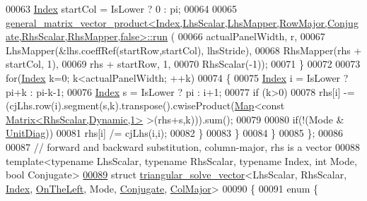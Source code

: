 \begin{DoxyCode}
00063         \hyperlink{namespace_eigen_a62e77e0933482dafde8fe197d9a2cfde}{Index} startCol = IsLower ? 0 : pi;
00064 
00065         
      \hyperlink{struct_eigen_1_1internal_1_1general__matrix__vector__product}{general\_matrix\_vector\_product<Index,LhsScalar,LhsMapper,RowMajor,Conjugate,RhsScalar,RhsMapper,false>::run}
      (
00066           actualPanelWidth, r,
00067           LhsMapper(&lhs.coeffRef(startRow,startCol), lhsStride),
00068           RhsMapper(rhs + startCol, 1),
00069           rhs + startRow, 1,
00070           RhsScalar(-1));
00071       \}
00072 
00073       \textcolor{keywordflow}{for}(\hyperlink{namespace_eigen_a62e77e0933482dafde8fe197d9a2cfde}{Index} k=0; k<actualPanelWidth; ++k)
00074       \{
00075         \hyperlink{namespace_eigen_a62e77e0933482dafde8fe197d9a2cfde}{Index} i = IsLower ? pi+k : pi-k-1;
00076         \hyperlink{namespace_eigen_a62e77e0933482dafde8fe197d9a2cfde}{Index} s = IsLower ? pi   : i+1;
00077         \textcolor{keywordflow}{if} (k>0)
00078           rhs[i] -= (cjLhs.row(i).segment(s,k).transpose().cwiseProduct(\hyperlink{group___core___module_class_eigen_1_1_map}{Map}<\textcolor{keyword}{const} 
      \hyperlink{group___core___module_class_eigen_1_1_matrix}{Matrix<RhsScalar,Dynamic,1>} >(rhs+s,k))).sum();
00079 
00080         \textcolor{keywordflow}{if}(!(Mode & \hyperlink{group__enums_gga39e3366ff5554d731e7dc8bb642f83cdaddb72f888ac85d5a1c52333e54f9374b}{UnitDiag}))
00081           rhs[i] /= cjLhs(i,i);
00082       \}
00083     \}
00084   \}
00085 \};
00086 
00087 \textcolor{comment}{// forward and backward substitution, column-major, rhs is a vector}
00088 \textcolor{keyword}{template}<\textcolor{keyword}{typename} LhsScalar, \textcolor{keyword}{typename} RhsScalar, \textcolor{keyword}{typename} Index, \textcolor{keywordtype}{int} Mode, \textcolor{keywordtype}{bool} Conjugate>
\hyperlink{struct_eigen_1_1internal_1_1triangular__solve__vector_3_01_lhs_scalar_00_01_rhs_scalar_00_01_ind063e019bb54cf6ae298090bc534a9cdf}{00089} \textcolor{keyword}{struct }\hyperlink{struct_eigen_1_1internal_1_1triangular__solve__vector}{triangular\_solve\_vector}<LhsScalar, RhsScalar, 
      \hyperlink{namespace_eigen_a62e77e0933482dafde8fe197d9a2cfde}{Index}, \hyperlink{group__enums_ggac22de43beeac7a78b384f99bed5cee0ba129609b3bdf23b071f5f86cf2f995ec4}{OnTheLeft}, Mode, \hyperlink{class_eigen_1_1_conjugate}{Conjugate}, \hyperlink{group__enums_ggaacded1a18ae58b0f554751f6cdf9eb13a0cbd4bdd0abcfc0224c5fcb5e4f6669a}{ColMajor}>
00090 \{
00091   \textcolor{keyword}{enum} \{

\end{DoxyCode}
